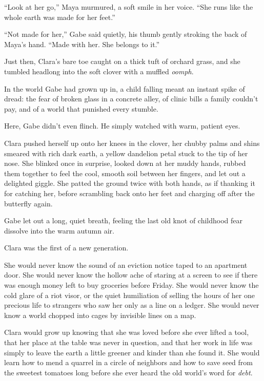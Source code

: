 ``Look at her go,'' Maya murmured, a soft smile in her voice. ``She runs like the whole earth was made for her feet.''

``Not made for her,'' Gabe said quietly, his thumb gently stroking the back of Maya's hand. ``Made with her. She belongs to it.''

Just then, Clara's bare toe caught on a thick tuft of orchard grass, and she tumbled headlong into the soft clover with a muffled \textit{oomph}. 

In the world Gabe had grown up in, a child falling meant an instant spike of dread: the fear of broken glass in a concrete alley, of clinic bills a family couldn't pay, and of a world that punished every stumble. 

Here, Gabe didn't even flinch. He simply watched with warm, patient eyes.

Clara pushed herself up onto her knees in the clover, her chubby palms and shins smeared with rich dark earth, a yellow dandelion petal stuck to the tip of her nose. She blinked once in surprise, looked down at her muddy hands, rubbed them together to feel the cool, smooth soil between her fingers, and let out a delighted giggle. She patted the ground twice with both hands, as if thanking it for catching her, before scrambling back onto her feet and charging off after the butterfly again.

Gabe let out a long, quiet breath, feeling the last old knot of childhood fear dissolve into the warm autumn air.

Clara was the first of a new generation.

She would never know the sound of an eviction notice taped to an apartment door. She would never know the hollow ache of staring at a screen to see if there was enough money left to buy groceries before Friday. She would never know the cold glare of a riot visor, or the quiet humiliation of selling the hours of her one precious life to strangers who saw her only as a line on a ledger. She would never know a world chopped into cages by invisible lines on a map.

Clara would grow up knowing that she was loved before she ever lifted a tool, that her place at the table was never in question, and that her work in life was simply to leave the earth a little greener and kinder than she found it. She would learn how to mend a quarrel in a circle of neighbors and how to save seed from the sweetest tomatoes long before she ever heard the old world's word for \textit{debt}.

